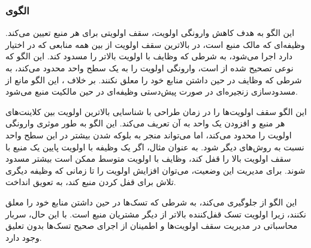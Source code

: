 \subsubsection{الگوی }
\label{resourceHighestLockerSec}
\begin{RTL}
این الگو به هدف کاهش وارونگی اولویت، سقف اولویتی برای هر منبع تعیین می‌کند.
وظیفه‌ای که مالک منبع است، در بالاترین سقف اولویت از بین همه
منابعی که در اختیار دارد اجرا می‌شود، به شرطی که وظایف
با اولویت بالاتر را مسدود کند. این الگو که نوعی تصحیح شده از
 است، وارونگی اولویت را به یک سطح
واحد محدود می‌کند، به شرطی که وظایف در حین داشتن منابع خود را معلق نکنند.
بر خلاف ، این الگو مانع از مسدودسازی
زنجیره‌ای در صورت پیش‌دستی وظیفه‌ای در حین مالکیت منبع می‌شود.
\end{RTL}
\begin{RTL}
این الگو سقف اولویت‌ها را در زمان طراحی با شناسایی بالاترین اولویت
بین کلاینت‌های هر منبع و افزودن یک واحد به آن تعریف می‌کند.
این الگو به طور موثری وارونگی اولویت را محدود می‌کند، اما می‌تواند منجر
به بلوکه شدن بیشتر در این سطح واحد نسبت به روش‌های دیگر شود.
به عنوان مثال، اگر یک وظیفه با اولویت پایین یک منبع با سقف اولویت بالا
را قفل کند، وظایف با اولویت متوسط ممکن است بیشتر مسدود شوند.
برای مدیریت این وضعیت، می‌توان افزایش اولویت را تا زمانی که
وظیفه دیگری تلاش برای قفل کردن منبع کند، به تعویق انداخت.
\end{RTL}
\begin{RTL}
این الگو از  جلوگیری می‌کند،
به شرطی که تسک‌ها در حین داشتن منابع خود را معلق نکنند،
زیرا اولویت تسک قفل‌کننده بالاتر از دیگر مشتریان منبع است.
با این حال، سربار محاسباتی در مدیریت سقف اولویت‌ها
و اطمینان از اجرای صحیح تسک‌ها بدون تعلیق وجود دارد.
\end{RTL}